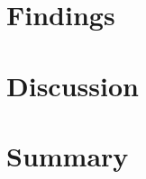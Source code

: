 \section{Findings}
\label{Ethics:Findings}

\section{Discussion}
\label{Ethics:Discussion}

\section{Summary}
\label{Ethics:Summary}